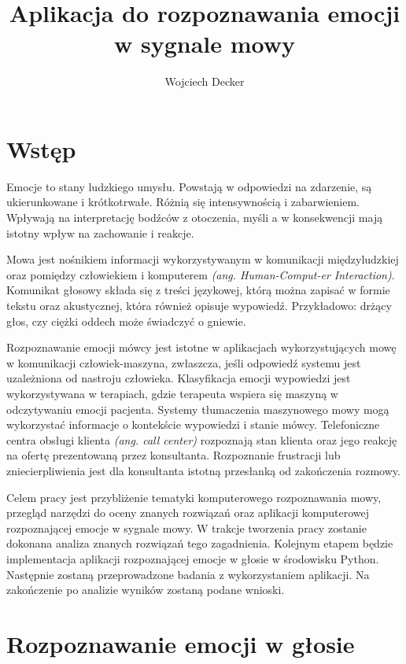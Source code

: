 \documentclass[a4paper,12pt,twoside,openany]{report}
\title{Aplikacja do rozpoznawania emocji w sygnale mowy}
\author{Wojciech Decker}
\newcommand*\NewPage{\newpage\null\thispagestyle{empty}\newpage}
\newcommand{\ang}[1]{\textit{(ang. #1)}}
\begin{document}
\maketitle
\chapter{Wstęp}
\label{ch:wstep}
Emocje to stany ludzkiego umysłu.
Powstają w odpowiedzi na zdarzenie, są ukierunkowane i krótkotrwałe.
Różnią się intensywnością i zabarwieniem.
Wpływają na interpretację bodźców z otoczenia,
myśli a w konsekwencji mają istotny wpływ na zachowanie i reakcje.

Mowa jest nośnikiem informacji wykorzystywanym w komunikacji międzyludzkiej
oraz pomiędzy człowiekiem i komputerem \- \ang{Human-Comput-er Interaction}. %
Komunikat głosowy składa się z treści językowej,
którą można zapisać w formie tekstu
oraz akustycznej, która również opisuje wypowiedź. Przykładowo:
drżący głos, czy ciężki oddech może świadczyć o gniewie.

Rozpoznawanie emocji mówcy jest istotne w aplikacjach wykorzystujących mowę w komunikacji człowiek-maszyna,
zwłaszcza, jeśli odpowiedź systemu jest uzależniona od nastroju człowieka.
Klasyfikacja emocji wypowiedzi jest wykorzystywana w terapiach,
gdzie terapeuta wspiera się maszyną w odczytywaniu emocji pacjenta.
Systemy tłumaczenia maszynowego mowy mogą wykorzystać informacje o kontekście wypowiedzi i stanie mówcy.
Telefoniczne centra obsługi klienta \ang{call center} rozpoznają stan klienta
oraz jego reakcję na ofertę prezentowaną przez konsultanta.
Rozpoznanie frustracji lub zniecierpliwienia jest dla konsultanta istotną przesłanką od zakończenia rozmowy.

Celem pracy jest przybliżenie tematyki komputerowego rozpoznawania mowy,
przegląd narzędzi do oceny znanych rozwiązań oraz aplikacji komputerowej rozpoznającej emocje w sygnale mowy.
W trakcje tworzenia pracy zostanie dokonana analiza znanych rozwiązań tego zagadnienia.
Kolejnym etapem będzie implementacja aplikacji rozpoznającej emocje w głosie w środowisku Python.
Następnie zostaną przeprowadzone badania z wykorzystaniem aplikacji.
Na zakończenie po analizie wyników zostaną podane wnioski.

\NewPage
\chapter{Rozpoznawanie emocji w głosie}
\end{document}
